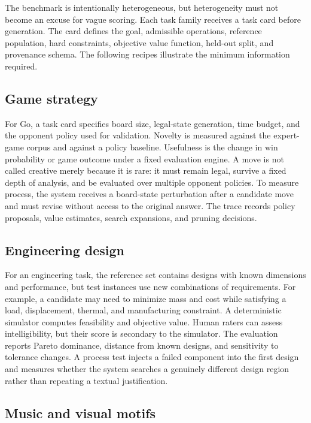 \documentclass[conference]{IEEEtran}
\begin{document}
The benchmark is intentionally heterogeneous, but heterogeneity must not become an
excuse for vague scoring. Each task family receives a task card before generation. The
card defines the goal, admissible operations, reference population, hard constraints,
objective value function, held-out split, and provenance schema. The following recipes
illustrate the minimum information required.

\subsection{Game strategy}

For Go, a task card specifies board size, legal-state generation, time budget, and the
opponent policy used for validation. Novelty is measured against the expert-game corpus
and against a policy baseline. Usefulness is the change in win probability or game
outcome under a fixed evaluation engine. A move is not called creative merely because it
is rare: it must remain legal, survive a fixed depth of analysis, and be evaluated over
multiple opponent policies. To measure process, the system receives a board-state
perturbation after a candidate move and must revise without access to the original
answer. The trace records policy proposals, value estimates, search expansions, and
pruning decisions.

\subsection{Engineering design}

For an engineering task, the reference set contains designs with known dimensions and
performance, but test instances use new combinations of requirements. For example, a
candidate may need to minimize mass and cost while satisfying a load, displacement,
thermal, and manufacturing constraint. A deterministic simulator computes feasibility
and objective value. Human raters can assess intelligibility, but their score is
secondary to the simulator. The evaluation reports Pareto dominance, distance from
known designs, and sensitivity to tolerance changes. A process test injects a failed
component into the first design and measures whether the system searches a genuinely
different design region rather than repeating a textual justification.

\subsection{Music and visual motifs}
\end{document}
